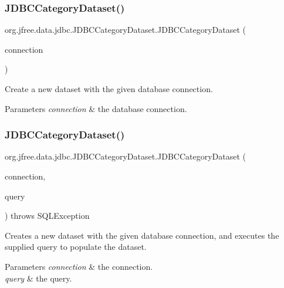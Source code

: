 \subsubsection{\texorpdfstring{J\+D\+B\+C\+Category\+Dataset()}{JDBCCategoryDataset()}\hspace{0.1cm}{\footnotesize\ttfamily [2/3]}}
{\footnotesize\ttfamily org.\+jfree.\+data.\+jdbc.\+J\+D\+B\+C\+Category\+Dataset.\+J\+D\+B\+C\+Category\+Dataset (\begin{DoxyParamCaption}\item[{Connection}]{connection }\end{DoxyParamCaption})}

Create a new dataset with the given database connection.


\begin{DoxyParams}{Parameters}
{\em connection} & the database connection. \\
\hline
\end{DoxyParams}
\mbox{\label{classorg_1_1jfree_1_1data_1_1jdbc_1_1_j_d_b_c_category_dataset_a130761231d8b73f6e6081ee87fb249dd}} 
\subsubsection{\texorpdfstring{J\+D\+B\+C\+Category\+Dataset()}{JDBCCategoryDataset()}\hspace{0.1cm}{\footnotesize\ttfamily [3/3]}}
{\footnotesize\ttfamily org.\+jfree.\+data.\+jdbc.\+J\+D\+B\+C\+Category\+Dataset.\+J\+D\+B\+C\+Category\+Dataset (\begin{DoxyParamCaption}\item[{Connection}]{connection,  }\item[{String}]{query }\end{DoxyParamCaption}) throws S\+Q\+L\+Exception}

Creates a new dataset with the given database connection, and executes the supplied query to populate the dataset.


\begin{DoxyParams}{Parameters}
{\em connection} & the connection. \\
\hline
{\em query} & the query.\\
\hline
\end{DoxyParams}


